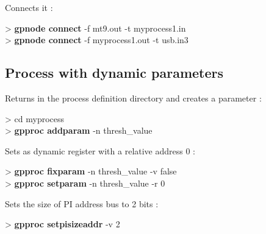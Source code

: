 \documentclass[10pt,a4paper]{article}
\begin{document}
Connects it :
\begin{sample}
> \textbf{gpnode connect} -f mt9.out -t myprocess1.in \\
> \textbf{gpnode connect} -f myprocess1.out -t usb.in3
\end{sample}

\subsection{Process with dynamic parameters}

Returns in the process definition directory and creates a parameter :
\begin{sample}
> cd myprocess \\
> \textbf{gpproc addparam} -n thresh\_value
\end{sample}

Sets as dynamic register with a relative address 0 :
\begin{sample}
> \textbf{gpproc fixparam} -n thresh\_value -v false \\
> \textbf{gpproc setparam} -n thresh\_value -r 0
\end{sample}

Sets the size of PI address bus to 2 bits :
\begin{sample}
> \textbf{gpproc setpisizeaddr} -v 2
\end{sample}
\end{document}
